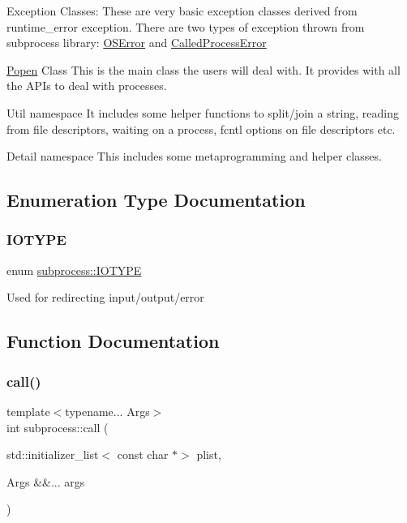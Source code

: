 \begin{DoxyEnumerate}
\item Exception Classes\+: These are very basic exception classes derived from runtime\+\_\+error exception. There are two types of exception thrown from subprocess library\+: \hyperlink{classsubprocess_1_1OSError}{O\+S\+Error} and \hyperlink{classsubprocess_1_1CalledProcessError}{Called\+Process\+Error}
\item \hyperlink{classsubprocess_1_1Popen}{Popen} Class This is the main class the users will deal with. It provides with all the A\+PI\textquotesingle{}s to deal with processes.
\item Util namespace It includes some helper functions to split/join a string, reading from file descriptors, waiting on a process, fcntl options on file descriptors etc.
\item Detail namespace This includes some metaprogramming and helper classes. 
\end{DoxyEnumerate}

\subsection{Enumeration Type Documentation}
\mbox{\label{namespacesubprocess_a8c21131feb99bed9ffa644851ff499ed}} 
\subsubsection{\texorpdfstring{I\+O\+T\+Y\+PE}{IOTYPE}}
{\footnotesize\ttfamily enum \hyperlink{namespacesubprocess_a8c21131feb99bed9ffa644851ff499ed}{subprocess\+::\+I\+O\+T\+Y\+PE}}

Used for redirecting input/output/error 

\subsection{Function Documentation}
\mbox{\label{namespacesubprocess_a2568089d153628506e8ed02f94f06682}} 
\subsubsection{\texorpdfstring{call()}{call()}}
{\footnotesize\ttfamily template$<$typename... Args$>$ \\
int subprocess\+::call (\begin{DoxyParamCaption}\item[{std\+::initializer\+\_\+list$<$ const char $\ast$$>$}]{plist,  }\item[{Args \&\&...}]{args }\end{DoxyParamCaption})}

